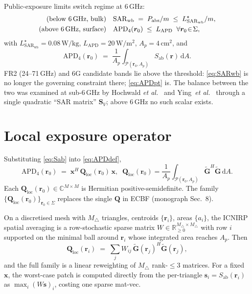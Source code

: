 \documentclass[journal]{IEEEtran}
\newcommand{\rr}{\bm{r}}
\newcommand{\xx}{\bm{x}}
\newcommand{\Gtil}{\widetilde{\mathbf{G}}}
\newcommand{\Sab}{S_{\mathrm{ab}}}
\newcommand{\SARwb}{\mathrm{SAR}_{\mathrm{wb}}}
\newcommand{\APD}{\mathrm{APD}}
\newcommand{\Pabs}{P_{\mathrm{abs}}}
\newcommand{\Q}{\mathbf{Q}}
\begin{document}
Public-exposure limits switch regime at $6$\,GHz:
\begin{align}
  \text{(below 6\,GHz, bulk)}\quad&
  \SARwb \;=\; \Pabs/m \;\le\; L_{\SARwb}^\star/m, \label{eq:SARwb}\\
  \text{(above 6\,GHz, surface)}\quad&
  \APD_4(\rr_0)\;\le\; L_{\APD} \;\;\forall\rr_0\!\in\!\Sigma,\label{eq:APDpt}
\end{align}
with $L_{\SARwb}^\star=0.08\,\mathrm{W/kg}$, $L_{\APD}=20\,\mathrm{W/m^2}$,
$A_p=4\,\mathrm{cm}^2$, and
\begin{equation}\label{eq:APDdef}
  \APD_4(\rr_0) \;=\; \frac{1}{A_p}\!\int_{\mathcal{P}(\rr_0,A_p)}\!\Sab(\rr)\,\mathrm{d} A.
\end{equation}
FR2 (24--71\,GHz) and 6G candidate bands lie above the threshold:
\eqref{eq:SARwb} is no longer the governing constraint there;
\eqref{eq:APDpt} is. The balance between the two was examined at
sub-6\,GHz by Hochwald \emph{et al.}~\cite{Hochwald2014} and
Ying~\emph{et al.}~\cite{Ying2015} through a single quadratic
``SAR matrix'' $\mathbf S_V$; above 6\,GHz no such scalar exists.

\section{Local exposure operator}\label{sec:local-Q}

Substituting \eqref{eq:Sab} into \eqref{eq:APDdef},
\begin{equation}\label{eq:Qloc}
  \APD_4(\rr_0) \;=\; \xx^H\,\Q_{\mathrm{loc}}(\rr_0)\,\xx,
  \;\;
  \Q_{\mathrm{loc}}(\rr_0) = \frac{1}{A_p}\!\int_{\mathcal{P}(\rr_0,A_p)}\!\Gtil^H\Gtil\,\mathrm{d} A .
\end{equation}
Each $\Q_{\mathrm{loc}}(\rr_0)\in\mathbb{C}^{M\times M}$ is Hermitian
positive-semidefinite. The family
$\{\Q_{\mathrm{loc}}(\rr_0)\}_{\rr_0\in\Sigma}$ replaces the single
$\Q$ in ECBF (monograph Sec.~8).

On a discretised mesh with $M_\triangle$ triangles, centroids
$\{\rr_i\}$, areas $\{a_i\}$, the ICNIRP spatial averaging is a
row-stochastic sparse matrix $W\in\mathbb{R}^{M_\triangle\times M_\triangle}_{\ge 0}$
with row $i$ supported on the minimal ball around $\rr_i$ whose
integrated area reaches $A_p$. Then
\begin{equation}\label{eq:QlocD}
  \Q_{\mathrm{loc}}(\rr_i)
  \;=\; \sum_{j} W_{ij}\,\Gtil(\rr_j)^H\Gtil(\rr_j),
\end{equation}
and the full family is a linear reweighting of $M_\triangle$ rank-$\!\le\! 3$
matrices. For a fixed $\xx$, the worst-case patch is computed directly
from the per-triangle $\bm{s}_i=\Sab(\rr_i)$ as $\max_i (W\bm{s})_i$,
costing one sparse mat-vec.
\end{document}
